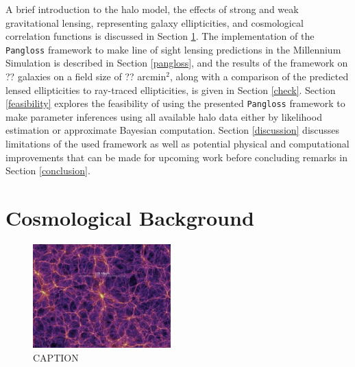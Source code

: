 \documentclass[%
 reprint,
 amsmath,amssymb,
 aps,nofootinbib
]{revtex4-1}
\begin{document}
A brief introduction to the halo model, the effects of strong and weak gravitational lensing, representing galaxy ellipticities, and cosmological correlation functions is discussed in Section \ref{background}. The implementation of the \texttt{Pangloss} framework to make line of sight lensing predictions in the Millennium Simulation is described in Section \ref{pangloss}, and the results of the framework on ?? galaxies on a field size of ?? arcmin$^2$, along with a comparison of the predicted lensed ellipticities to ray-traced ellipticities, is given in Section \ref{check}. Section \ref{feasibility} explores the feasibility of using the presented \texttt{Pangloss} framework to make parameter inferences using all available halo data either by likelihood estimation or approximate Bayesian computation. Section \ref{discussion} discusses limitations of the used framework as well as potential physical and computational improvements that can be made for upcoming work before concluding remarks in Section \ref{conclusion}.

\section{Cosmological Background} \label{background}

\begin{figure}
    \centering
    \includegraphics[width=0.475\textwidth]{figs-swe/thesis/ms_structure.jpg}
    \captionsetup{justification=raggedright,singlelinecheck=false}
    \caption{CAPTION}
    \label{fig:ms_structure}
\end{figure}
\end{document}
